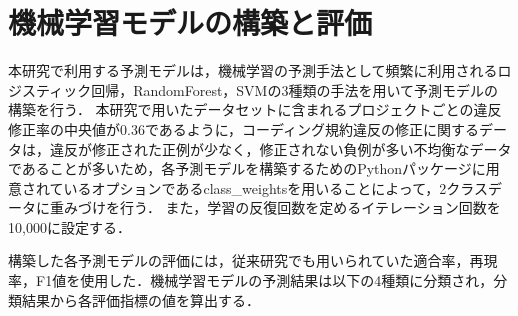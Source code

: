 \documentclass[11pt,dvipdfmx]{jreport}
\begin{document}

\section{機械学習モデルの構築と評価}

本研究で利用する予測モデルは，機械学習の予測手法として頻繁に利用されるロジスティック回帰，RandomForest，SVMの3種類の手法を用いて予測モデルの構築を行う．
本研究で用いたデータセットに含まれるプロジェクトごとの違反修正率の中央値が0.36であるように，コーディング規約違反の修正に関するデータは，違反が修正された正例が少なく，修正されない負例が多い不均衡なデータであることが多いため，各予測モデルを構築するためのPythonパッケージに用意されているオプションであるclass\_weightsを用いることによって，2クラスデータに重みづけを行う．
また，学習の反復回数を定めるイテレーション回数を10,000に設定する．

構築した各予測モデルの評価には，従来研究でも用いられていた適合率，再現率，F1値を使用した．機械学習モデルの予測結果は以下の4種類に分類され，分類結果から各評価指標の値を算出する．


\end{document}
